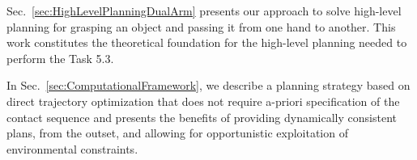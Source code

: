 \documentclass[a4paper,11pt,pdf]{pacmanreport}
\begin{document}
Sec.~\ref{sec:HighLevelPlanningDualArm} presents our approach to solve high-level planning for grasping an object and passing it from one hand to another. This work constitutes the theoretical foundation for the high-level planning needed to perform the Task 5.3.

In Sec.~\ref{sec:ComputationalFramework}, we describe a planning strategy based on direct trajectory optimization that does not require a-priori specification of the contact sequence and presents the benefits of providing dynamically consistent plans, from the outset, and allowing for opportunistic exploitation of environmental constraints.















\end{document}
